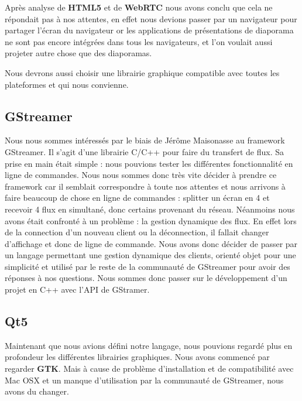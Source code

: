 \documentclass[a4paper, 11pt]{article}
\begin{document}
Après analyse de \textbf{HTML5} et de \textbf{WebRTC} nous avons conclu que cela ne répondait pas à nos attentes, en effet nous devions passer par un navigateur pour partager l'écran du navigateur or les applications de présentations de diaporama ne sont pas encore intégrées dans tous les navigateurs, et l'on voulait aussi projeter autre chose que des diaporamas.

Nous devrons aussi choisir une librairie graphique compatible avec toutes les plateformes et qui nous convienne.

\subsection{GStreamer}

Nous nous sommes intéressés par le biais de Jérôme Maisonasse au framework GStreamer. Il s'agit d'une librairie C/C++ pour faire du transfert de flux. Sa prise en main était simple : nous pouvions tester les différentes fonctionnalité en ligne de commandes. Nous nous sommes donc très vite décider à prendre ce framework car il semblait correspondre à toute nos attentes et nous arrivons à faire beaucoup de chose en ligne de commandes : splitter un écran en 4 et recevoir 4 flux en simultané, donc certains provenant du réseau. Néanmoins nous avons était confronté à un problème : la gestion dynamique des flux. En effet lors de la connection d'un nouveau client ou la déconnection, il fallait changer d'affichage et donc de ligne de commande. Nous avons donc décider de passer par un langage permettant une gestion dynamique des clients, orienté objet pour une simplicité et utilisé par le reste de la communauté de GStreamer pour avoir des réponses à nos questions. Nous sommes donc passer sur le développement d'un projet en C++ avec l'API de GStramer.

\subsection{Qt5}

Maintenant que nous avions défini notre langage, nous pouvions regardé plus en profondeur les différentes librairies graphiques. Nous avons commencé par regarder \textbf{GTK}. Mais à cause de problème d'installation et de compatibilité avec Mac OSX et un manque d'utilisation par la communauté de GStreamer, nous avons du changer. 
\end{document}

